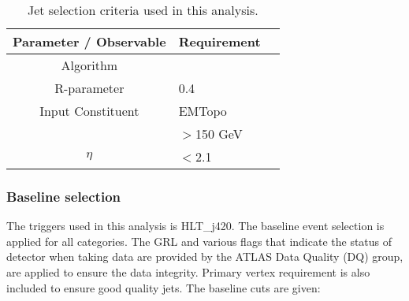 \begin{table}[ht]
	\centering
		\begin{tabular}{clc}
			\hline
			Parameter / Observable & Requirement \\
			\hline
			Algorithm & \akt \\
			R-parameter & 0.4 \\
			Input Constituent & EMTopo\\
			\pt & $>$150 GeV \\
			\textbar$\eta$\textbar & $<$2.1 \\
			\hline
	\end{tabular}
\caption{Jet selection criteria used in this analysis.}
\label{tab:jetCalibration}
\end{table}


\subsubsection{Baseline selection}
\label{sec:base_selection}






The triggers used in this analysis is HLT\_j420. The baseline event selection is applied for all categories. The GRL and various flags that indicate the status of detector when taking data are provided by the ATLAS Data Quality (DQ) group, are applied to ensure the data integrity. Primary vertex requirement is also included to ensure good quality jets. The baseline cuts are given:

